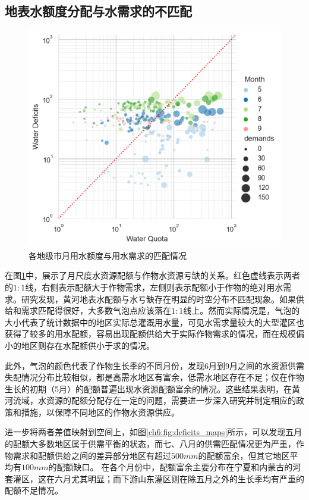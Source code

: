 
\subsection{地表水额度分配与水需求的不匹配}

\begin{figure}[htb]
    \centering
    \includegraphics[width=\textwidth]{img/ch6/ch6_matches.png}
    \caption{各地级市月用水额度与用水需求的匹配情况}\label{ch6:fig:matches}
\end{figure}

在图\ref{ch6:fig:matches}中，展示了月尺度水资源配额与作物水资源亏缺的关系。红色虚线表示两者的$1:1$线，右侧表示配额大于作物需求，左侧则表示配额小于作物的绝对用水需求。研究发现，黄河地表水配额与水亏缺存在明显的时空分布不匹配现象。如果供给和需求匹配得很好，大多数气泡点应该落在$1:1$线上。然而实际情况是，气泡的大小代表了统计数据中的地区实际总灌溉用水量，可见水需求量较大的大型灌区也获得了较多的用水配额，容易出现配额供给大于实际作物需求的情况，而在规模偏小的地区则存在水配额供小于求的情况。

此外，气泡的颜色代表了作物生长季的不同月份，发现6月到9月之间的水资源供需失配情况分布比较相似，都是高需水地区有富余，低需水地区存在不足；仅在作物生长的初期（5月）的配额普遍出现水资源配额富余的情况。这些结果表明，在黄河流域，水资源的配额分配存在一定的问题，需要进一步深入研究并制定相应的政策和措施，以保障不同地区的作物水资源供应。

进一步将两者差值映射到空间上，如图\ref{ch6:fig:deficits_maps}所示，可以发现五月的配额大多数地区属于供需平衡的状态，而七、八月的供需匹配情况更为严重，作物需求和配额供给之间的差异部分地区有超过$500mm$的配额富余，但其它地区平均有$100mm$的配额缺口。
在各个月份中，配额富余主要分布在宁夏和内蒙古的河套灌区，这在六月尤其明显；而下游山东灌区则在除五月之外的生长季均有严重的配额不足情况。

